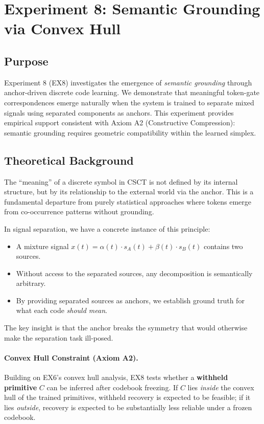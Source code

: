 \documentclass{article}
\begin{document}
\section{Experiment 8: Semantic Grounding via Convex Hull}

\subsection{Purpose}
Experiment 8 (EX8) investigates the emergence of \emph{semantic grounding} through anchor-driven discrete code learning.
We demonstrate that meaningful token-gate correspondences emerge naturally when the system is trained to separate mixed signals using separated components as anchors.
This experiment provides empirical support consistent with Axiom A2 (Constructive Compression): semantic grounding requires geometric compatibility within the learned simplex.

\subsection{Theoretical Background}
The ``meaning'' of a discrete symbol in CSCT is not defined by its internal structure, but by its relationship to the external world via the anchor.
This is a fundamental departure from purely statistical approaches where tokens emerge from co-occurrence patterns without grounding.

In signal separation, we have a concrete instance of this principle:
\begin{itemize}
    \item A mixture signal $x(t) = \alpha(t) \cdot s_A(t) + \beta(t) \cdot s_B(t)$ contains two sources.
    \item Without access to the separated sources, any decomposition is semantically arbitrary.
    \item By providing separated sources as anchors, we establish ground truth for what each code \emph{should mean}.
\end{itemize}

The key insight is that the anchor breaks the symmetry that would otherwise make the separation task ill-posed.

\paragraph{Convex Hull Constraint (Axiom A2).}
Building on EX6's convex hull analysis, EX8 tests whether a \textbf{withheld primitive} $C$ can be inferred after codebook freezing.
If $C$ lies \emph{inside} the convex hull of the trained primitives, withheld recovery is expected to be feasible; if it lies \emph{outside}, recovery is expected to be substantially less reliable under a frozen codebook.
\end{document}
